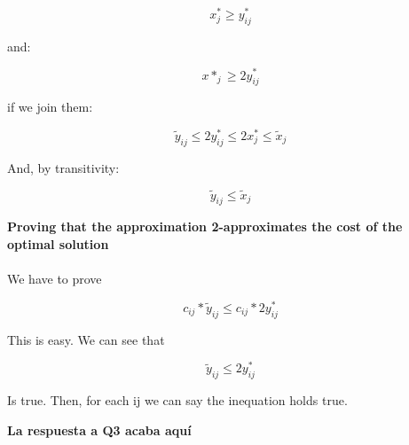   \[ x^*_{j} \geq y^*_{ij} \]

and:

  \[ x*_{j} \geq 2y^*_{ij} \]
  
if we join them:

  \[ \tilde{y}_{ij} \leq 2y^*_{ij} \leq 2x^*_{j} \leq \tilde{x}_{j} \]

And, by transitivity:

  \[ \tilde{y}_{ij} \leq \tilde{x}_{j} \]

\textbf{Proving that the approximation 2-approximates the cost of
the optimal solution}
\\ \\
We have to prove

 \[ c_{ij} * \tilde{y}_{ij} \leq c_{ij} * 2y^*_{ij} \]

This is easy. We can see that

  \[ \tilde{y}_{ij} \leq 2y^*_{ij} \]

Is true. Then, for each ij we can say the inequation 
holds true.

\textbf{La respuesta a Q3 acaba aquí}

\paragraph{}
